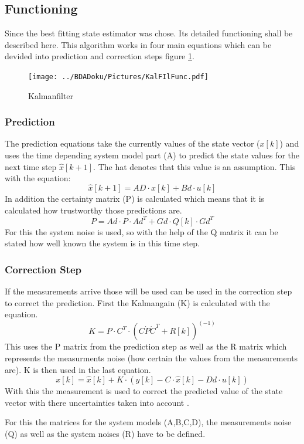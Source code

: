   \subsection{Functioning}
  Since the best fitting state estimator was chose. Its detailed functioning shall be described here.
  This algorithm works in four main equations which can be devided into prediction and correction steps figure \ref{fig:Kalmanfilter}.

  \begin{figure}[h!]
    \centering
    \texttt{[image: ../BDADoku/Pictures/KalFIlFunc.pdf]}
    \caption{Kalmanfilter}
    \label{fig:Kalmanfilter}
  \end{figure}

  \subsubsection{Prediction}
  The prediction equations take the currently values of the state vector ($x[k]$)
  and uses the time depending system model part (A) to predict the state values for the next time step $\hat{x}[k+1]$.
  The hat denotes that this value is an assumption.
  This with the equation: $$ \hat{x}[k+1] = AD\cdot x[k] + Bd\cdot u[k] $$
  In addition the certainty matrix (P) is calculated which means that it is calculated how trustworthy those predictions are.
  $$ P = Ad\cdot P\cdot Ad^T + Gd\cdot Q[k]\cdot Gd^T$$
  For this the system noise is used, so with the help of the Q matrix it can be stated how well known the system is in this
  time step.

  \subsubsection{Correction Step}
  If the measurements arrive those will be used can be used in the correction step to correct the prediction.
  First the Kalmangain (K) is calculated with the equation.
  $$ K = P\cdot C^T\cdot (C\dot P\dot C^T + R[k])^{(-1)} $$ 
  This uses the P matrix from the prediction step as well as the R matrix which represents the measurments noise (how certain the values from the measurements are).
  K is then used in the last equation. $$x[k] = \hat{x}[k] + K\cdot (y[k] - C\cdot \hat{x}[k]-Dd\cdot u[k])$$
  With this the measurement is used to correct the predicted value of the state vector with there uncertainties taken into account \cite{DavidWSchultz2004}. 

  For this the matrices for the system models (A,B,C,D), the measurements noise (Q) as well as the system noises (R) have to be defined.
  
  
  
  